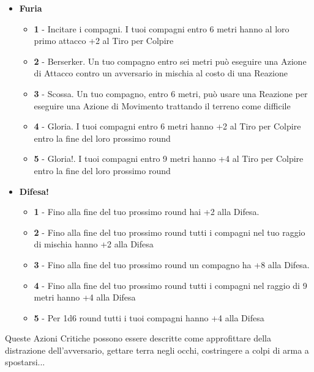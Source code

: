 \begin{multicols}{2}
\begin{itemize}[leftmargin=*]
	\item \textbf{Furia}
	\begin{itemize}[leftmargin=*]
		\setlength{\itemsep}{0pt}
		\item \textbf{1} - Incitare i compagni. I tuoi compagni entro 6 metri hanno al loro primo attacco +2 al Tiro per Colpire

		\item \textbf{2} - Berserker. Un tuo compagno entro sei metri può eseguire una Azione di Attacco contro un avversario in mischia al costo di una Reazione

		\item \textbf{3} - Scossa. Un tuo compagno, entro 6 metri, può usare una Reazione per eseguire una Azione di Movimento trattando il terreno come difficile

		\item \textbf{4} - Gloria. I tuoi compagni entro 6 metri hanno +2 al Tiro per Colpire entro la fine del loro prossimo round

		\item \textbf{5} - Gloria!. I tuoi compagni entro 9 metri hanno +4 al Tiro per Colpire entro la fine del loro prossimo round
	\end{itemize}

	\item \textbf{Difesa!}
	\begin{itemize}[leftmargin=*]
		\setlength{\itemsep}{0pt}
		\item \textbf{1} - Fino alla fine del tuo prossimo round hai +2 alla Difesa.

		\item \textbf{2} - Fino alla fine del tuo prossimo round tutti i compagni nel tuo raggio di mischia hanno +2 alla Difesa

		\item \textbf{3} - Fino alla fine del tuo prossimo round un compagno ha +8 alla Difesa.

		\item \textbf{4} - Fino alla fine del tuo prossimo round tutti i compagni nel raggio di 9 metri hanno +4 alla Difesa

		\item \textbf{5} - Per 1d6 round tutti i tuoi compagni hanno +4 alla Difesa
	\end{itemize}

\end{itemize}

\medskip

\begin{changemargin}{0.3cm}{0.3cm}\begin{narratore}
Queste Azioni Critiche possono essere descritte come approfittare della distrazione dell'avversario, gettare terra negli occhi, costringere a colpi di arma a spostarsi...
\end{narratore}\end{changemargin}


\end{multicols}
